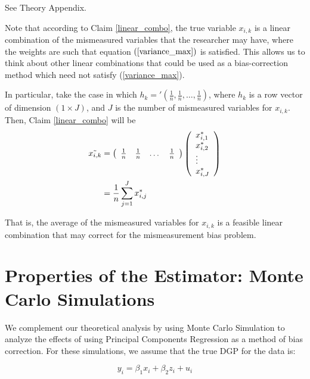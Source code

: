 \documentclass[10pt]{article}
\makeatletter
\renewenvironment{proof}[1][\proofname] {\par\pushQED{\qed}\normalfont\topsep6\p@\@plus6\p@\relax\trivlist\item[\hskip\labelsep\bfseries#1\@addpunct{.}]\ignorespaces}{\popQED\endtrivlist\@endpefalse}
\makeatother
\begin{document}
        \begin{proof}
            See Theory Appendix.
        \end{proof}
        
        Note that according to Claim \ref{linear_combo}, the true variable $x_{i,k}$ is a linear combination of the mismeasured variables that the researcher may have, where the weights are such that equation $(\ref{variance_max})$ is satisfied. This allows us to think about other linear combinations that could be used as a bias-correction method which need not satisfy (\ref{variance_max}). 
        
        In particular, take the case in which $h_k='(\frac{1}{n},\frac{1}{n},\dots,\frac{1}{n})$, where $h_k$ is a row vector of dimension $(1\times J)$, and $J$ is the number of mismeasured variables for $x_{i,k}$. Then, Claim \ref{linear_combo} will be
        \begin{align}
            \Tilde{x_{i,k}}&=\left(\begin{array}{cccc}
            \frac{1}{n} & \frac{1}{n} & \dots &\frac{1}{n} 
            \end{array}\right)\left(\begin{array}{l}
            x^*_{i,1} \\
            x^*_{i,2} \\
            \vdots \\
            x^*_{i,J} 
            \end{array}\right)\\
            &=\frac{1}{n}\sum_{j=1}^J x^*_{i,j}
        \end{align}
        
        That is, the average of the mismeasured variables for $x_{i,k}$ is a feasible linear combination that may correct for the mismeasurement bias problem.

    \section*{Properties of the Estimator: Monte Carlo Simulations}

        We complement our theoretical analysis by using Monte Carlo Simulation to analyze the effects of using Principal Components Regression as a method of bias correction. For these simulations, we assume that the true DGP for the data is:

        $$y_i = \beta_1 x_i + \beta_2 z_i + u_i$$
\end{document}
